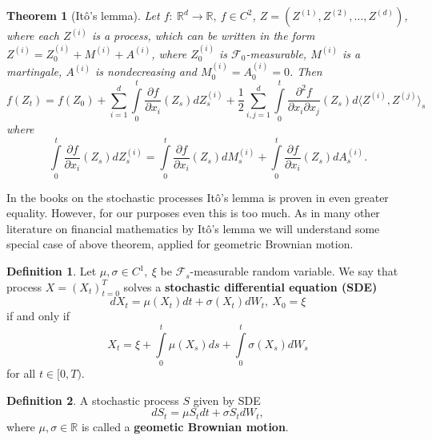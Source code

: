 \documentclass[a4paper,12pt]{article}
\newtheorem{thm}{Theorem}[section]
\theoremstyle{definition}
\newtheorem{mydef}{Definition}[section]
\theoremstyle{remark}
\newtheorem{remark}{Remark}
\begin{document}
\begin{thm}[It\^{o}'s lemma]
 \label{thm:itoGen}
 Let $f:\ \mathbb{R}^d \rightarrow \mathbb{R},\ f \in C^2$, $Z = (Z^{(1)}, Z^{(2)}, \ldots, Z^{(d)})$, where each $Z^{(i)}$ is a process, which can be written in the form $Z^{(i)} = Z^{(i)}_0 + M^{(i)} + A^{(i)}$, where $Z^{(i)}_0$ is $\mathcal{F}_0$-measurable, $M^{(i)}$ is a martingale, $A^{(i)}$ is nondecreasing and $M^{(i)}_0=A^{(i)}_0=0$. Then
 \begin{equation}
  f(Z_t) = f(Z_0) + \sum\limits_{i=1}^d \int\limits_0^t \frac{\partial f}{\partial x_i}(Z_s)dZ^{(i)}_s + \frac{1}{2}\sum\limits_{i,j=1}^d \int\limits_0^t \frac{\partial^2 f}{\partial x_i\partial x_j}(Z_s)d\langle Z^{(i)}, Z^{(j)}\rangle_s
  \label{eq:itoGen}
 \end{equation}
 where 
 \begin{equation*}
  \int\limits_0^t \frac{\partial f}{\partial x_i}(Z_s)dZ^{(i)}_s = \int\limits_0^t \frac{\partial f}{\partial x_i}(Z_s)dM^{(i)}_s + \int\limits_0^t \frac{\partial f}{\partial x_i}(Z_s)dA^{(i)}_s.
 \end{equation*}
\end{thm}
\noindent In the books on the stochastic processes It\^{o}'s lemma is proven in even greater equality. However, for our purposes even this is too much. As in many other literature on financial mathematics by It\^{o}'s lemma we will understand some special case of above theorem, applied for geometric Brownian motion. 

\begin{mydef}
 Let $\mu, \sigma \in C^1,\ \xi$ be $\mathcal{F}_s$-measurable random variable. We say that process $X=(X_t)_{t=0}^T$ solves a \textbf{stochastic differential equation (SDE)}
 \[dX_t = \mu(X_t)dt + \sigma(X_t) dW_t,\ X_0 = \xi\]
 if and only if
 \[X_t = \xi + \int\limits_0^t \mu(X_s)ds + \int\limits_0^t\sigma(X_s) dW_s\]
for all $t \in [0,T)$.
\end{mydef}


\begin{mydef}
 A stochastic process $S$ given by SDE
 \begin{equation}
  dS_t = \mu S_t dt + \sigma S_t dW_t, 
  \label{eq:gbm}
 \end{equation}
where $\mu,\sigma \in \mathbb{R}$ is called a \textbf{geometic Brownian motion}.
\end{mydef}
\end{document}
